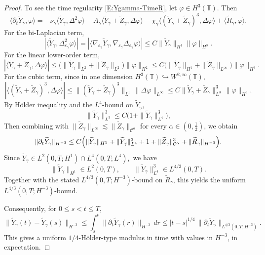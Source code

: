 \documentclass{article}
\begin{document}
\begin{proof}
To see the time regularity \eqref{E:Ygamma-TimeR}, let \(\varphi\in H^3(\mathbb T)\). Then
\[
\langle \partial_t \widetilde Y_\gamma,\varphi\rangle
=
- \nu_{\gamma}\langle \widetilde Y_\gamma,\Delta^2\varphi\rangle
-
A_\gamma\langle \widetilde Y_\gamma+\widetilde Z_\gamma,\Delta\varphi\rangle
-
\chi_{\gamma}\langle (\widetilde Y_\gamma+\widetilde Z_\gamma)^3,\Delta\varphi\rangle
+
\langle \widetilde R_\gamma,\varphi\rangle.
\]
For the bi-Laplacian term,
\[
|\langle \widetilde Y_\gamma, \Delta_{\varepsilon_\gamma}^2\varphi\rangle|
=
|\langle \nabla_{\varepsilon_\gamma} \widetilde Y_\gamma,\nabla_{\varepsilon_\gamma}\Delta_{\varepsilon_\gamma}\varphi\rangle|
\le
C\|\widetilde Y_\gamma\|_{H^1}\|\varphi\|_{H^3}.
\]
For the linear lower-order term,
\[
|\langle \widetilde Y_\gamma+\widetilde Z_\gamma,\Delta\varphi\rangle|
\le
\bigl(\|\widetilde Y_\gamma\|_{L^2}+\|\widetilde Z_\gamma\|_{L^2}\bigr)\|\varphi\|_{H^2}
\le
C\bigl(\|\widetilde Y_\gamma\|_{H^1}+\|\widetilde Z_\gamma\|_{L^\infty}\bigr)\|\varphi\|_{H^3}.
\]
For the cubic term, since in one dimension \(H^3(\mathbb T)\hookrightarrow W^{2,\infty}(\mathbb T)\),
\[
|\langle (\widetilde Y_\gamma+\widetilde Z_\gamma)^3,\Delta\varphi\rangle|
\le
\|(\widetilde Y_\gamma+\widetilde Z_\gamma)^3\|_{L^1}\,\|\Delta\varphi\|_{L^\infty}
\le
C\|\widetilde Y_\gamma+\widetilde Z_\gamma\|_{L^3}^3\,\|\varphi\|_{H^3}.
\]
By Hölder inequality and the \(L^4\)-bound on \(\widetilde Y_\gamma\),
\[
\|\widetilde Y_\gamma\|_{L^3}^3
\le
C\bigl(1+\|\widetilde Y_\gamma\|_{L^4}^3\bigr),
\]
Then combining with $\|\widetilde Z_\gamma\|_{L^\infty}
\lesssim
\|\widetilde Z_\gamma\|_{\mathcal C^\alpha}$ for every \(\alpha \in (0, \frac{1}{2})\),
we obtain
\[
\|\partial_t \widetilde Y_\gamma\|_{H^{-3}}
\le
C\Bigl(
\|\widetilde Y_\gamma\|_{H^1}
+
\|\widetilde Y_\gamma\|_{L^4}^3
+
1
+
\|\widetilde Z_\gamma\|_{\mathcal C^\alpha}^3
+
\|\widetilde R_\gamma\|_{H^{-3}}
\Bigr).
\]
Since
\(
\widetilde Y_\gamma\in L^2(0,T;H^1)\cap L^4(0,T;L^4),
\)
we have
\[
\|\widetilde Y_\gamma\|_{H^1}\in L^2(0,T),
\qquad
\|\widetilde Y_\gamma\|_{L^4}^3\in L^{4/3}(0,T).
\]
Together with the stated \(L^{4/3}(0,T;H^{-3})\)-bound on
\(\widetilde R_\gamma\), this yields the uniform
\(L^{4/3}(0,T;H^{-3})\)-bound.

Consequently, for \(0\le s<t\le T\),
\[
\|\widetilde Y_\gamma(t)-\widetilde Y_\gamma(s)\|_{H^{-3}}
\le
\int_s^t \|\partial_t\widetilde Y_\gamma(r)\|_{H^{-3}}\,dr
\le
|t-s|^{1/4}\,
\|\partial_t\widetilde Y_\gamma\|_{L^{4/3}(0,T;H^{-3})}.
\]
This gives a uniform \(1/4\)-H\"older-type modulus in time with values in \(H^{-3}\), in expectation.
\end{proof}
\end{document}
